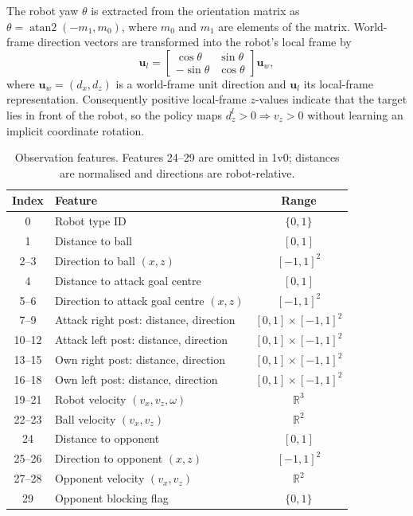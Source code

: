 \documentclass[conference]{IEEEtran}
\begin{document}
The robot yaw $\theta$ is extracted from the orientation matrix as
$\theta = \operatorname{atan2}(-m_1, m_0)$, where $m_0$ and $m_1$ are elements of
the matrix. World-frame direction vectors are transformed into the robot's local
frame by
\begin{equation}
\mathbf{u}_l =
\begin{bmatrix}
\cos\theta & \sin\theta \\
-\sin\theta & \cos\theta
\end{bmatrix}
\mathbf{u}_w ,
\end{equation}
where $\mathbf{u}_w = (d_x, d_z)$ is a world-frame unit direction and
$\mathbf{u}_l$ its local-frame representation. Consequently positive local-frame
$z$-values indicate that the target lies in front of the robot, so the policy maps
$d_z^l > 0 \Rightarrow v_z > 0$ without learning an implicit coordinate rotation.

\begin{table}[t]
    \centering
    \caption{Observation features. Features 24--29 are omitted in 1v0; distances
    are normalised and directions are robot-relative.}
    \label{tab:obs}
    \begin{tabular}{c l c}
        \hline
        \textbf{Index} & \textbf{Feature} & \textbf{Range} \\
        \hline
        0      & Robot type ID                                  & $\{0,1\}$ \\
        1      & Distance to ball                               & $[0,1]$ \\
        2--3   & Direction to ball $(x,z)$                      & $[-1,1]^2$ \\
        4      & Distance to attack goal centre                 & $[0,1]$ \\
        5--6   & Direction to attack goal centre $(x,z)$        & $[-1,1]^2$ \\
        7--9   & Attack right post: distance, direction         & $[0,1]\times[-1,1]^2$ \\
        10--12 & Attack left post: distance, direction          & $[0,1]\times[-1,1]^2$ \\
        13--15 & Own right post: distance, direction            & $[0,1]\times[-1,1]^2$ \\
        16--18 & Own left post: distance, direction             & $[0,1]\times[-1,1]^2$ \\
        19--21 & Robot velocity $(v_x,v_z,\omega)$              & $\mathbb{R}^3$ \\
        22--23 & Ball velocity $(v_x,v_z)$                      & $\mathbb{R}^2$ \\
        24     & Distance to opponent                           & $[0,1]$ \\
        25--26 & Direction to opponent $(x,z)$                  & $[-1,1]^2$ \\
        27--28 & Opponent velocity $(v_x,v_z)$                  & $\mathbb{R}^2$ \\
        29     & Opponent blocking flag                         & $\{0,1\}$ \\
        \hline
    \end{tabular}
\end{table}
\end{document}

